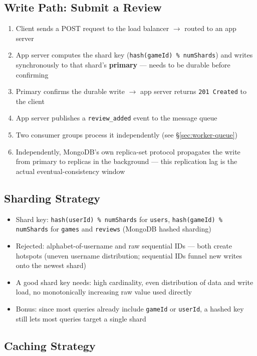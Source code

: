 \documentclass[11pt]{article}
\begin{document}
\subsection{Write Path: Submit a Review}

\begin{enumerate}[nosep]
    \item Client sends a POST request to the load balancer $\rightarrow$ routed to an app server
    \item App server computes the shard key (\texttt{hash(gameId) \% numShards}) and writes synchronously to that shard's \textbf{primary} --- needs to be durable before confirming
    \item Primary confirms the durable write $\rightarrow$ app server returns \texttt{201 Created} to the client
    \item App server publishes a \texttt{review\_added} event to the message queue
    \item Two consumer groups process it independently (see \S\ref{sec:worker-queue})
    \item Independently, MongoDB's own replica-set protocol propagates the write from primary to replicas in the background --- this replication lag is the actual eventual-consistency window
\end{enumerate}

\subsection{Sharding Strategy}

\begin{itemize}[nosep]
    \item Shard key: \texttt{hash(userId) \% numShards} for \texttt{users}, \texttt{hash(gameId) \% numShards} for \texttt{games} and \texttt{reviews} (MongoDB hashed sharding)
    \item Rejected: alphabet-of-username and raw sequential IDs --- both create hotspots (uneven username distribution; sequential IDs funnel new writes onto the newest shard)
    \item A good shard key needs: high cardinality, even distribution of data and write load, no monotonically increasing raw value used directly
    \item Bonus: since most queries already include \texttt{gameId} or \texttt{userId}, a hashed key still lets most queries target a single shard
\end{itemize}

\subsection{Caching Strategy}
\end{document}
